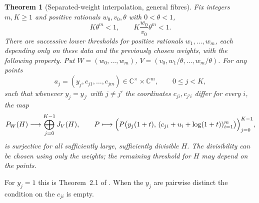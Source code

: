\documentclass[11pt]{amsart}
\newtheorem{theorem}[lemma]{Theorem}
\newcommand{\C}{\mathbb{C}}
\begin{document}
\begin{theorem}[Separated-weight interpolation, general fibres]\label{interp}
Fix integers $m,K\ge1$ and positive rationals $w_0,v_0,\theta$ with $0<\theta<1$,
\begin{equation}\label{2.1}
K\theta^m<1,\qquad K\frac{w_0}{v_0}\theta^m<1.
\end{equation}
There are successive lower thresholds for positive rationals $w_1,\dots,w_m$, each depending only on these data and the previously chosen weights, with the following property. Put $W=(w_0,\dots,w_m)$, $V=(v_0,w_1/\theta,\dots,w_m/\theta)$. For any points
\[
a_j=(y_j,c_{j1},\dots,c_{jm})\in\C^\times\times\C^m,\qquad0\le j<K,
\]
such that whenever $y_j=y_{j'}$ with $j\ne j'$ the coordinates $c_{ji},c_{j'i}$ differ for every $i$, the map
\begin{equation}\label{2.2}
P_W(H)\longrightarrow\bigoplus_{j=0}^{K-1}J_V(H),\qquad P\longmapsto\Bigl(P\bigl(y_j(1+t),\,(c_{ji}+u_i+\log(1+t))_{i=1}^m\bigr)\Bigr)_{j=0}^{K-1},
\end{equation}
is surjective for all sufficiently large, sufficiently divisible $H$. The divisibility can be chosen using only the weights; the remaining threshold for $H$ may depend on the points.
\end{theorem}

For $y_j=1$ this is Theorem~2.1 of \cite{OAI}. When the $y_j$ are pairwise distinct the condition on the $c_{ji}$ is empty.
\end{document}
